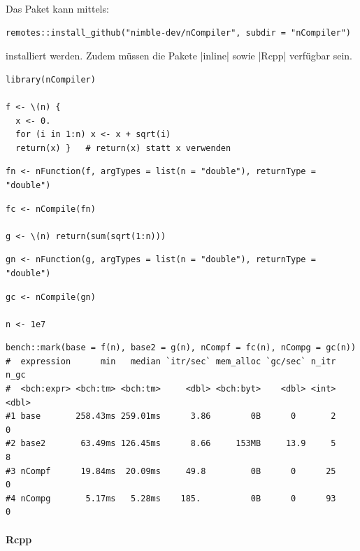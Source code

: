 \documentclass[10pt,twocolumn]{scrartcl}
\renewcommand{\lstinline}{\mycoloredinline}
\begin{document}
Das Paket kann mittels:
\begin{lstlisting}[basicstyle=\fontsize{9.4pt}{9.7pt}\selectfont\ttfamily]
remotes::install_github("nimble-dev/nCompiler", subdir = "nCompiler")
\end{lstlisting}
  installiert werden. Zudem müssen die Pakete \lstinline|inline| sowie \lstinline|Rcpp| verfügbar sein.

\begin{lstlisting}
library(nCompiler)

f <- \(n) {
  x <- 0.
  for (i in 1:n) x <- x + sqrt(i)
  return(x) }   # return(x) statt x verwenden

\end{lstlisting}
\begin{lstlisting}[aboveskip=-2pt,basicstyle=\fontsize{8.8pt}{9.pt}\selectfont\ttfamily]
fn <- nFunction(f, argTypes = list(n = "double"), returnType = "double")
\end{lstlisting}
\begin{lstlisting}[aboveskip=-2pt]
fc <- nCompile(fn)

g <- \(n) return(sum(sqrt(1:n)))
\end{lstlisting}
\begin{lstlisting}[aboveskip=-2pt,basicstyle=\fontsize{8.8pt}{9.pt}\selectfont\ttfamily]
gn <- nFunction(g, argTypes = list(n = "double"), returnType = "double")
\end{lstlisting}
\begin{lstlisting}[aboveskip=-2pt]
gc <- nCompile(gn)

n <- 1e7
\end{lstlisting}
\begin{lstlisting}[aboveskip=-2pt,basicstyle=\fontsize{8.8pt}{9.pt}\selectfont\ttfamily]
bench::mark(base = f(n), base2 = g(n), nCompf = fc(n), nCompg = gc(n))
#  expression      min   median `itr/sec` mem_alloc `gc/sec` n_itr  n_gc
#  <bch:expr> <bch:tm> <bch:tm>     <dbl> <bch:byt>    <dbl> <int> <dbl>
#1 base       258.43ms 259.01ms      3.86        0B      0       2     0
#2 base2       63.49ms 126.45ms      8.66     153MB     13.9     5     8
#3 nCompf      19.84ms  20.09ms     49.8         0B      0      25     0
#4 nCompg       5.17ms   5.28ms    185.          0B      0      93     0
\end{lstlisting}


\paragraph{Rcpp}
\end{document}
